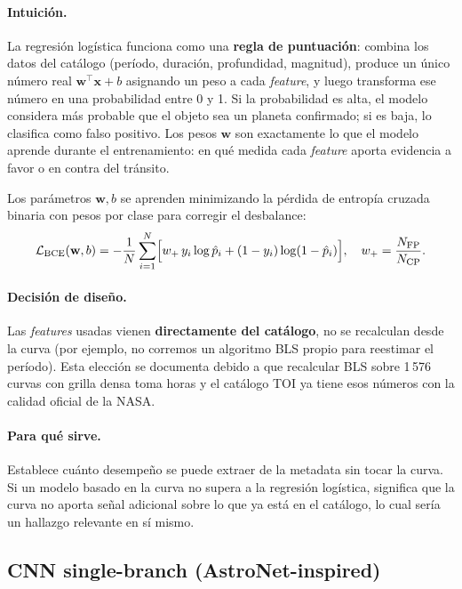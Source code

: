 \documentclass[11pt,a4paper]{article}
\begin{document}
\paragraph{Intuición.}
La regresión logística funciona como una \textbf{regla de
puntuación}: combina los datos del catálogo (período, duración,
profundidad, magnitud), produce un único número real
$\mathbf{w}^\top \mathbf{x} + b$ asignando un peso a cada
\textit{feature}, y luego transforma ese número en una probabilidad
entre 0 y 1. Si la probabilidad es alta, el modelo considera más
probable que el objeto sea un planeta confirmado; si es baja, lo
clasifica como falso positivo. Los pesos $\mathbf{w}$ son
exactamente lo que el modelo aprende durante el entrenamiento: en
qué medida cada \textit{feature} aporta evidencia a favor o en
contra del tránsito.

Los parámetros $\mathbf{w}, b$ se aprenden minimizando la pérdida de
entropía cruzada binaria con pesos por clase para corregir el
desbalance:
\begin{equation}
\mathcal{L}_{\text{BCE}}(\mathbf{w}, b) = -\frac{1}{N}\sum_{i=1}^{N}
  \Bigl[ w_+\,y_i\log \hat{p}_i + (1-y_i)\log(1-\hat{p}_i) \Bigr],
\quad w_+ = \frac{N_{\text{FP}}}{N_{\text{CP}}}.
\label{eq:bce-weighted}
\end{equation}

\paragraph{Decisión de diseño.}
Las \textit{features} usadas vienen \textbf{directamente del catálogo},
no se recalculan desde la curva (por ejemplo, no corremos un algoritmo
BLS propio para reestimar el período). Esta elección se documenta debido a que  recalcular BLS sobre 1\,576 curvas con grilla densa toma horas y el catálogo TOI ya tiene esos números
con la calidad oficial de la NASA.

\paragraph{Para qué sirve.}
Establece cuánto desempeño se puede extraer de la metadata sin tocar
la curva. Si un modelo basado en la curva no supera a la regresión
logística, significa que la curva no aporta señal adicional sobre lo
que ya está en el catálogo, lo cual sería un hallazgo relevante en
sí mismo.

\subsection{CNN single-branch (AstroNet-inspired)}
\label{subsec:cnn}
\end{document}

